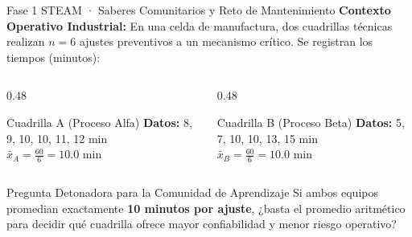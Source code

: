 \documentclass[
	spanish,
	aspectratio=169,
	xcolor={dvipsnames,table}
]{beamer}
\begin{document}
\begin{frame}{Fase 1 STEAM · Saberes Comunitarios y Reto de Mantenimiento}
\small
\textbf{Contexto Operativo Industrial:} En una celda de manufactura, dos cuadrillas técnicas realizan $n=6$ ajustes preventivos a un mecanismo crítico. Se registran los tiempos (minutos):
\vspace{0.25cm}
\begin{columns}[T]
	\begin{column}{0.48\textwidth}
		\begin{block}{Cuadrilla A (Proceso Alfa)}
			\centering \textbf{Datos:} 8, 9, 10, 10, 11, 12 min\\[0.1cm]
			$\bar{x}_A = \frac{60}{6} = 10.0$ min
		\end{block}
	\end{column}
	\begin{column}{0.48\textwidth}
		\begin{block}{Cuadrilla B (Proceso Beta)}
			\centering \textbf{Datos:} 5, 7, 10, 10, 13, 15 min\\[0.1cm]
			$\bar{x}_B = \frac{60}{6} = 10.0$ min
		\end{block}
	\end{column}
\end{columns}
\vspace{0.35cm}
\begin{alertblock}{Pregunta Detonadora para la Comunidad de Aprendizaje}
	Si ambos equipos promedian exactamente \textbf{10 minutos por ajuste}, ¿basta el promedio aritmético para decidir qué cuadrilla ofrece mayor confiabilidad y menor riesgo operativo?
\end{alertblock}
\end{frame}
\end{document}
